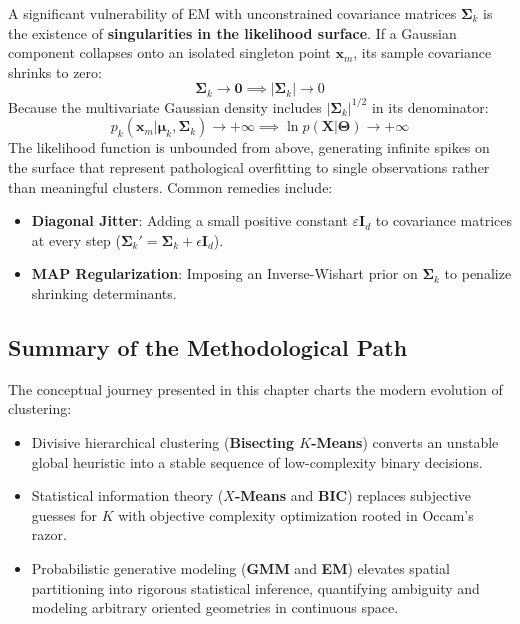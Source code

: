 A significant vulnerability of EM with unconstrained covariance matrices $\boldsymbol{\Sigma}_k$ is the existence of \textbf{singularities in the likelihood surface}. If a Gaussian component collapses onto an isolated singleton point $\mathbf{x}_m$, its sample covariance shrinks to zero:
\begin{equation}
\boldsymbol{\Sigma}_k \to \mathbf{0} \implies |\boldsymbol{\Sigma}_k| \to 0
\end{equation}
Because the multivariate Gaussian density includes $|\boldsymbol{\Sigma}_k|^{1/2}$ in its denominator:
\begin{equation}
p_k(\mathbf{x}_m | \boldsymbol{\mu}_k, \boldsymbol{\Sigma}_k) \to +\infty \implies \ln p(\mathbf{X} | \boldsymbol{\Theta}) \to +\infty
\end{equation}
The likelihood function is unbounded from above, generating infinite spikes on the surface that represent pathological overfitting to single observations rather than meaningful clusters. Common remedies include:
\begin{itemize}
    \item \textbf{Diagonal Jitter}: Adding a small positive constant $\varepsilon \mathbf{I}_d$ to covariance matrices at every step ($\boldsymbol{\Sigma}_k' = \boldsymbol{\Sigma}_k + \epsilon \mathbf{I}_d$).
    \item \textbf{MAP Regularization}: Imposing an Inverse-Wishart prior on $\boldsymbol{\Sigma}_k$ to penalize shrinking determinants.
\end{itemize}

\subsection{Summary of the Methodological Path}

The conceptual journey presented in this chapter charts the modern evolution of clustering:
\begin{itemize}
    \item Divisive hierarchical clustering (\textbf{Bisecting $K$-Means}) converts an unstable global heuristic into a stable sequence of low-complexity binary decisions.
    \item Statistical information theory (\textbf{$X$-Means} and \textbf{BIC}) replaces subjective guesses for $K$ with objective complexity optimization rooted in Occam's razor.
    \item Probabilistic generative modeling (\textbf{GMM} and \textbf{EM}) elevates spatial partitioning into rigorous statistical inference, quantifying ambiguity and modeling arbitrary oriented geometries in continuous space.
\end{itemize}
